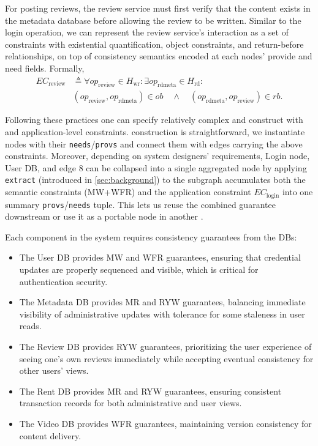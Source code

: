 For posting reviews,
the review service must first verify that the content exists in the
metadata database before allowing the review to be written. Similar to
the login operation, we can represent the review service's interaction
as a set of constraints with existential quantification, object constraints,
and return-before relationships, on top of consistency semantics
encoded at each nodes' provide and need fields. Formally,
\begin{align*}
EC_{\text{review}} &\triangleq \forall op_{\text{review}} \in H_{\text{wr}} : \exists op_{\text{rdmeta}} \in H_{\text{rd}} :\\
&(op_{\text{review}}, op_{\text{rdmeta}}) \in ob \quad \land \quad (op_{\text{rdmeta}}, op_{\text{review}}) \in rb.
\end{align*}

Following these practices one can specify relatively complex and construct \sysgraph with \sysmods and application-level constraints.
\sysgraph construction is straightforward, we instantiate nodes with their
\texttt{needs}/\texttt{provs} and connect them with edges carrying the above constraints.
Moreover, depending on system designers' requirements, Login node, User DB, and edge 8 can be collapsed into a single
aggregated node by applying \texttt{extract} (introduced in \cref{sec:background}) to the subgraph accumulates
both the semantic constraints (MW+WFR) and the application constraint $EC_{\text{login}}$ into one summary \texttt{provs}/\texttt{needs} tuple.
This lets us reuse the combined guarantee downstream or use it as a portable node in another \sysgraph.


Each component in the system requires consistency guarantees
from the DBs:%
\begin{itemize}
\item The User DB provides MW and WFR guarantees, ensuring
  that credential updates are properly sequenced and visible, which
  is critical for authentication security.
\item The Metadata DB provides MR and RYW guarantees,
  balancing immediate visibility of administrative updates with
  tolerance for some staleness in user reads.
\item The Review DB provides RYW guarantees, prioritizing the
  user experience of seeing one's own reviews immediately while
  accepting eventual consistency for other users' views.
\item The Rent DB provides MR and RYW guarantees, ensuring
  consistent transaction records for both administrative and user views.
\item The Video DB provides WFR guarantees, maintaining
  version consistency for content delivery.
\end{itemize}

